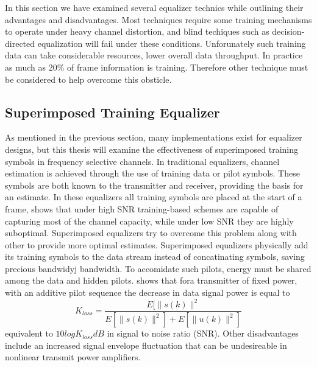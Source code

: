 \documentclass[11pt]{mvlthesis}
\begin{document}
In this section we have examined several equalizer technics while outlining their advantages and disadvantages.  Most techniques require some training mechanisms to operate under heavy channel distortion, and blind techiques such as decision-directed equalization will fail under these conditions.  Unforunately such training data can take considerable resources, lower overall data throughput.  In practice as much as 20\% of frame information is training.  Therefore other technique must be considered to help overcome this obsticle.\\


\subsection{Superimposed Training Equalizer}

As mentioned in the previous section, many implementations exist for equalizer designs, but this thesis will examine the effectiveness of superimposed training symbols in frequency selective channels.  In traditional equalizers, channel estimation is achieved through the use of training data or pilot symbols.  These symbols are both known to the transmitter and receiver, providing the basis for an estimate.  In these equalizers all training symbols are placed at the start of a frame,\cite{16} shows that under high SNR training-based schemes are capable of capturing most of the channel capacity, while under low SNR they are highly suboptimal.  Superimposed equalizers try to overcome this problem along with other to provide more optimal estimates.  Superimposed equalizers physically add its training symbols to the data stream instead of concatinating symbols, saving precious bandwidyj bandwidth\cite{16}.  To accomidate such pilots, energy must be shared among the data and hidden pilots\cite{15}.  \cite{19} shows that fora transmitter of fixed power, with an additive pilot sequence the decrease in data signal power is equal to \[ K_{loss}=\frac{E[\|s(k)\|^{2}}{E[\|s(k)\|^{2}]+E[\|u(k)\|^{2}]}\] equivalent to \(10logK_{loss}dB\) in signal to noise ratio (SNR).  Other disadvantages include an increased signal envelope fluctuation that can be undesireable in nonlinear transmit power amplifiers\cite{17}.\\  
\end{document}
